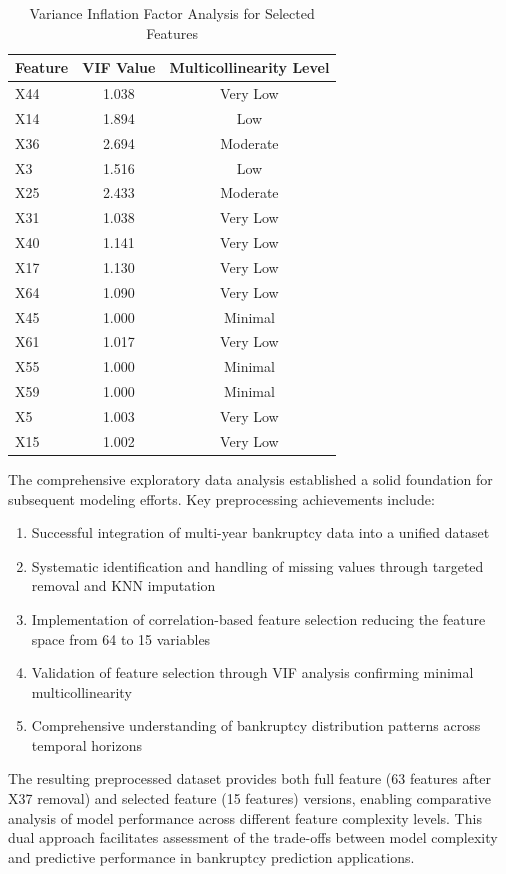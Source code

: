 \begin{table}[H]
    \centering
    \caption{Variance Inflation Factor Analysis for Selected Features}
    \label{tab:vif_analysis}
    \begin{tabular}{lcc}
    \toprule
    \textbf{Feature} & \textbf{VIF Value} & \textbf{Multicollinearity Level} \\
    \midrule
    X44 & 1.038 & Very Low \\
    X14 & 1.894 & Low \\
    X36 & 2.694 & Moderate \\
    X3 & 1.516 & Low \\
    X25 & 2.433 & Moderate \\
    X31 & 1.038 & Very Low \\
    X40 & 1.141 & Very Low \\
    X17 & 1.130 & Very Low \\
    X64 & 1.090 & Very Low \\
    X45 & 1.000 & Minimal \\
    X61 & 1.017 & Very Low \\
    X55 & 1.000 & Minimal \\
    X59 & 1.000 & Minimal \\
    X5 & 1.003 & Very Low \\
    X15 & 1.002 & Very Low \\
    \bottomrule
    \end{tabular}
\end{table}

The comprehensive exploratory data analysis established a solid foundation for subsequent modeling efforts. Key preprocessing achievements include:

\begin{enumerate}
    \item Successful integration of multi-year bankruptcy data into a unified dataset
    \item Systematic identification and handling of missing values through targeted removal and KNN imputation
    \item Implementation of correlation-based feature selection reducing the feature space from 64 to 15 variables
    \item Validation of feature selection through VIF analysis confirming minimal multicollinearity
    \item Comprehensive understanding of bankruptcy distribution patterns across temporal horizons
\end{enumerate}

The resulting preprocessed dataset provides both full feature (63 features after X37 removal) and selected feature (15 features) versions, enabling comparative analysis of model performance across different feature complexity levels. This dual approach facilitates assessment of the trade-offs between model complexity and predictive performance in bankruptcy prediction applications. 